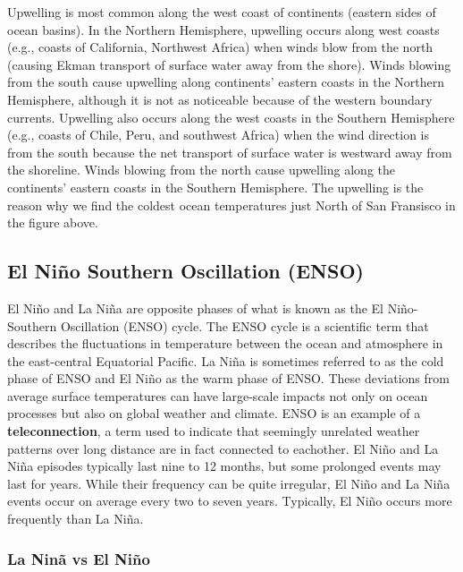 \documentclass[12pt,oneside]{book}
\begin{document}
Upwelling is most common along the west coast of continents (eastern
sides of ocean basins). In the Northern Hemisphere, upwelling occurs
along west coasts (e.g., coasts of California, Northwest Africa) when
winds blow from the north (causing Ekman transport of surface water away
from the shore). Winds blowing from the south cause upwelling along
continents' eastern coasts in the Northern Hemisphere, although it is
not as noticeable because of the western boundary currents. Upwelling
also occurs along the west coasts in the Southern Hemisphere (e.g.,
coasts of Chile, Peru, and southwest Africa) when the wind direction is
from the south because the net transport of surface water is westward
away from the shoreline. Winds blowing from the north cause upwelling
along the continents' eastern coasts in the Southern Hemisphere. The
upwelling is the reason why we find the coldest ocean temperatures just
North of San Fransisco in the figure above.

\subsection{El Niño Southern Oscillation
(ENSO)}\label{el-niuxf1o-southern-oscillation-enso}

El Niño and La Niña are opposite phases of what is known as the El
Niño-Southern Oscillation (ENSO) cycle. The ENSO cycle is a scientific
term that describes the fluctuations in temperature between the ocean
and atmosphere in the east-central Equatorial Pacific. La Niña is
sometimes referred to as the cold phase of ENSO and El Niño as the warm
phase of ENSO. These deviations from average surface temperatures can
have large-scale impacts not only on ocean processes but also on global
weather and climate. ENSO is an example of a \textbf{teleconnection}, a
term used to indicate that seemingly unrelated weather patterns over
long distance are in fact connected to eachother. El Niño and La Niña
episodes typically last nine to 12 months, but some prolonged events may
last for years. While their frequency can be quite irregular, El Niño
and La Niña events occur on average every two to seven years. Typically,
El Niño occurs more frequently than La Niña.

\subsubsection{La Ninã vs El Niño}\label{la-ninuxe3-vs-el-niuxf1o}
\end{document}
